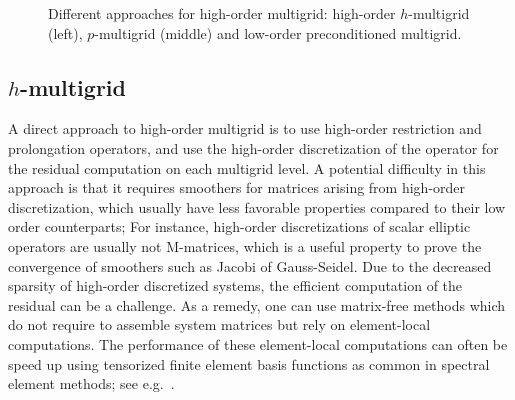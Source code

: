 \documentclass[smallcondensed,final]{svjour3}     %
\begin{document}
\begin{figure}
		\caption{\label{fig:approaches} Different approaches
                  for high-order multigrid: high-order $h$-multigrid
                  (left), $p$-multigrid (middle) and low-order
                  preconditioned multigrid.}
\end{figure}

\subsection{$h$-multigrid}\label{subsec:h}
A direct approach to high-order multigrid is to use high-order
restriction and prolongation operators, and use the high-order
discretization of the operator for the residual computation on each
multigrid level.  A potential difficulty in this approach is that it
requires smoothers for matrices arising from high-order
discretization, which usually have less favorable properties compared
to their low order counterparts; For instance, high-order
discretizations of scalar elliptic operators are usually not
M-matrices, which is a useful property to prove the convergence of
smoothers such as Jacobi of Gauss-Seidel.  Due to the decreased
sparsity of high-order discretized systems, the efficient computation
of the residual can be a challenge. As a remedy, one can use
matrix-free methods which do not require to assemble system matrices
but rely on element-local computations. The performance of these
element-local computations can often be speed up using tensorized
finite element basis functions as common in spectral element methods;
see e.g.~\cite{DevilleFischerMund02}.
\end{document}
